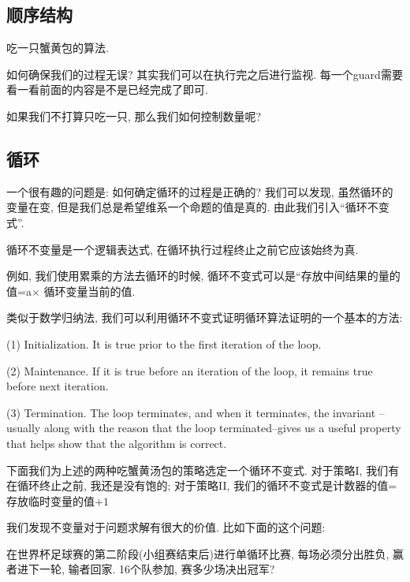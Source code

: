 \subsection*{顺序结构}

\begin{example}
	吃一只蟹黄包的算法. 
\end{example}

如何确保我们的过程无误? 其实我们可以在执行完之后进行监视. 每一个guard需要看一看前面的内容是不是已经完成了即可. 

如果我们不打算只吃一只, 那么我们如何控制数量呢? 

\subsection*{循环}


一个很有趣的问题是: 如何确定循环的过程是正确的? 我们可以发现, 虽然循环的变量在变, 但是我们总是希望维系一个命题的值是真的. 由此我们引入``循环不变式''. 

\begin{definition}[循环不变式]
	循环不变量是一个逻辑表达式, 在循环执行过程终止之前它应该始终为真. 
\end{definition}

例如, 我们使用累乘的方法去循环的时候, 循环不变式可以是``存放中间结果的量的值=a$\times$ 循环变量当前的值. 

类似于数学归纳法, 我们可以利用循环不变式证明循环算法证明的一个基本的方法: 

\begin{theorem}[证明循环不变式的基本方法]
(1)	Initialization. It is true prior to the first iteration of the loop.

(2) Maintenance. If it is true before an iteration of the loop, it remains true before next iteration. 

(3) Termination. The loop terminates, and when it terminates, the invariant -- usually along with the reason that the loop terminated--gives us a useful property that helps show that the algorithm is correct. 
\end{theorem}

下面我们为上述的两种吃蟹黄汤包的策略选定一个循环不变式. 对于策略I, 我们有在循环终止之前, 我还是没有饱的; 对于策略II, 我们的循环不变式是计数器的值=存放临时变量的值$+1$

我们发现不变量对于问题求解有很大的价值. 比如下面的这个问题: 

\begin{prob}
	在世界杯足球赛的第二阶段(小组赛结束后)进行单循环比赛, 每场必须分出胜负, 赢者进下一轮, 输者回家. 16个队参加, 赛多少场决出冠军? 
\end{prob} 


